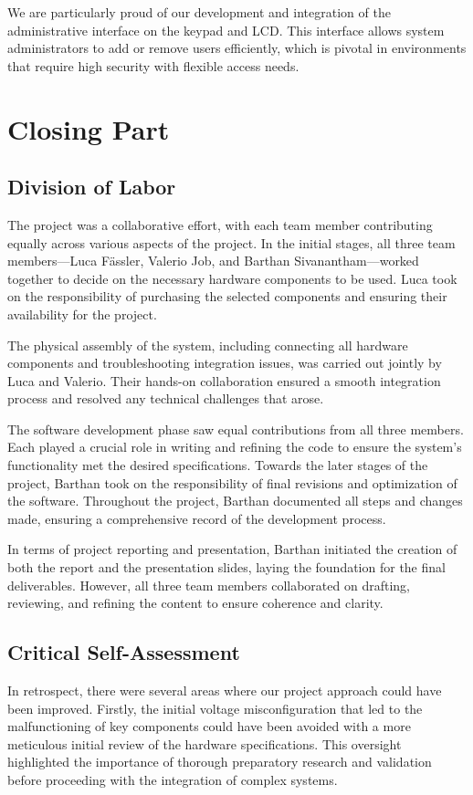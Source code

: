 \documentclass{article}
\begin{document}
We are particularly proud of our development and integration of the administrative interface on the keypad and LCD. This interface allows system administrators to add or remove users efficiently, which is pivotal in environments that require high security with flexible access needs.

\newpage
\section{Closing Part}

\subsection{Division of Labor}
The project was a collaborative effort, with each team member contributing equally across various aspects of the project. In the initial stages, all three team members—Luca Fässler, Valerio Job, and Barthan Sivanantham—worked together to decide on the necessary hardware components to be used. Luca took on the responsibility of purchasing the selected components and ensuring their availability for the project.

The physical assembly of the system, including connecting all hardware components and troubleshooting integration issues, was carried out jointly by Luca and Valerio. Their hands-on collaboration ensured a smooth integration process and resolved any technical challenges that arose.

The software development phase saw equal contributions from all three members. Each played a crucial role in writing and refining the code to ensure the system's functionality met the desired specifications. Towards the later stages of the project, Barthan took on the responsibility of final revisions and optimization of the software. Throughout the project, Barthan documented all steps and changes made, ensuring a comprehensive record of the development process.

In terms of project reporting and presentation, Barthan initiated the creation of both the report and the presentation slides, laying the foundation for the final deliverables. However, all three team members collaborated on drafting, reviewing, and refining the content to ensure coherence and clarity.

\subsection{Critical Self-Assessment}
In retrospect, there were several areas where our project approach could have been improved. Firstly, the initial voltage misconfiguration that led to the malfunctioning of key components could have been avoided with a more meticulous initial review of the hardware specifications. This oversight highlighted the importance of thorough preparatory research and validation before proceeding with the integration of complex systems.
\end{document}
